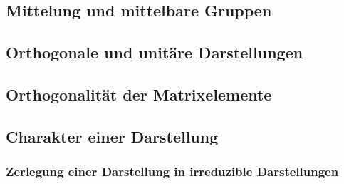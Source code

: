 %
%
\subsection{Mittelung und mittelbare Gruppen}

%
%
\subsection{Orthogonale und unitäre Darstellungen}

%
%
\subsection{Orthogonalität der Matrixelemente}

%
%
\subsection{Charakter einer Darstellung}

%
%
\subsubsection{Zerlegung einer Darstellung in irreduzible Darstellungen}
